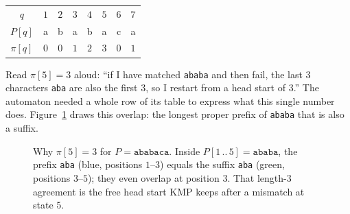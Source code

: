 \begin{center}
\begin{tabular}{c|ccccccc}
\toprule
$q$ & $1$ & $2$ & $3$ & $4$ & $5$ & $6$ & $7$ \\
$P[q]$ & a & b & a & b & a & c & a \\
$\pi[q]$ & $0$ & $0$ & $1$ & $2$ & $3$ & $0$ & $1$ \\
\bottomrule
\end{tabular}
\end{center}

Read $\pi[5]=3$ aloud: ``if I have matched \texttt{ababa} and then fail, the
last $3$ characters \texttt{aba} are also the first $3$, so I restart from a head
start of $3$.'' The automaton needed a whole row of its table to express what this
single number does. Figure~\ref{ch31:fig-prefix} draws this overlap: the longest
proper prefix of \texttt{ababa} that is also a suffix.

\begin{figure}[H]
\centering
{}
\caption{Why $\pi[5]=3$ for $P=\texttt{ababaca}$. Inside $P[1\,..\,5]=\texttt{ababa}$,
the prefix \texttt{aba} (blue, positions $1$--$3$) equals the suffix \texttt{aba}
(green, positions $3$--$5$); they even overlap at position $3$. That length-$3$
agreement is the free head start KMP keeps after a mismatch at state $5$.}
\label{ch31:fig-prefix}
\end{figure}

